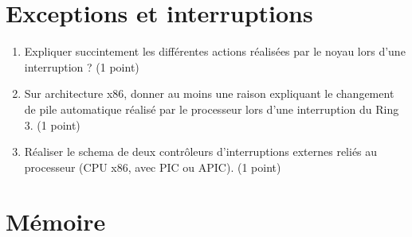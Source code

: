 \section{{Exceptions et interruptions}
         {\hfill{} }}
\begin{enumerate}
  \item Expliquer succintement les différentes actions réalisées par le noyau lors d'une interruption ? (1 point)
  \item Sur architecture x86, donner au moins une raison expliquant le changement de pile automatique réalisé par le processeur lors d'une interruption du Ring 3. (1 point)
  \item Réaliser le schema de deux contrôleurs d'interruptions externes reliés au processeur (CPU x86, avec PIC ou APIC). (1 point)
\end{enumerate}

\section{{Mémoire}
         {\hfill{} }}

